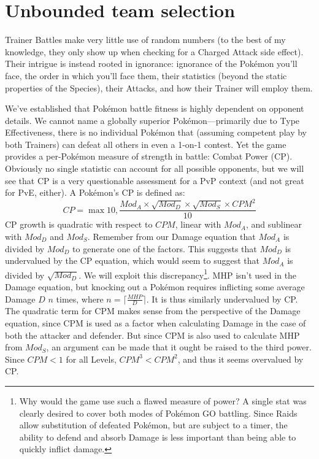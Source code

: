 \chapter{Unbounded team selection}
\label{chap:unbounded}
Trainer Battles make very little use of random numbers (to the best of my
 knowledge, they only show up when checking for a Charged Attack side
 effect).
Their intrigue is instead rooted in ignorance: ignorance of
 the Pokémon you'll face, the order in which you'll face them,
 their statistics (beyond the static properties of the Species),
 their Attacks, and how their Trainer will employ them.

We've established that Pokémon battle fitness is highly dependent
 on opponent details.
We cannot name a globally superior Pokémon---primarily due to Type Effectiveness,
 there is no individual Pokémon that (assuming competent play by both Trainers)
 can defeat all others in even a 1-on-1 contest.
Yet the game provides a per-Pokémon measure of strength in battle: Combat Power (CP).
Obviously no single statistic can account for all possible opponents, but
 we will see that CP is a very questionable assessment for a PvP
 context (and not great for PvE, either).
A Pokémon's CP is defined as:
\[ CP = \max{10, \frac{Mod_A \times \sqrt{Mod_D} \times \sqrt{Mod_S} \times CPM^2}{10}} \]
CP growth is quadratic with respect to $CPM$, linear with $Mod_A$, and
  sublinear with $Mod_D$ and $Mod_S$.
Remember from our Damage equation that $Mod_A$ is divided by $Mod_D$
 to generate one of the factors.
This suggests that $Mod_D$ is undervalued by the CP equation, which
 would seem to suggest that $Mod_A$ is divided by $\sqrt{Mod_D}$.
We will exploit this discrepancy\footnote{Why would the game use such
 a flawed measure of power? A single stat was clearly desired to cover both
 modes of Pokémon GO battling. Since Raids allow substitution of defeated
 Pokémon, but are subject to a timer, the ability to defend and absorb
 Damage is less important than being able to quickly inflict damage.}.
MHP isn't used in the Damage equation, but knocking out a Pokémon
 requires inflicting some average Damage $D$ $n$ times,
 where $n = \lceil\frac{MHP}{D}\rceil$.
It is thus similarly undervalued by CP\@.
The quadratic term for CPM makes sense from the perspective of the Damage
 equation, since CPM is used as a factor when calculating Damage in the
 case of both the attacker and defender.
But since CPM is also used to calculate MHP from $Mod_S$, an argument
 can be made that it ought be raised to the third power.
Since $CPM < 1$ for all Levels, $CPM^3 < CPM^2$, and thus it seems
 overvalued by CP\@.

